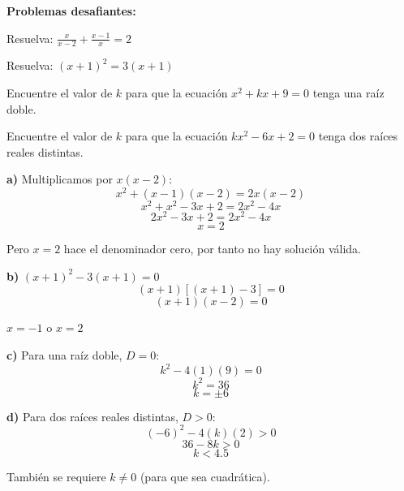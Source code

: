 \begin{exercise}
\problem \textbf{Problemas desafiantes:}

\begin{exerciselist}
    \item Resuelva: $\frac{x}{x-2} + \frac{x-1}{x} = 2$

    \item Resuelva: $(x + 1)^2 = 3(x + 1)$

    \item Encuentre el valor de $k$ para que la ecuación $x^2 + kx + 9 = 0$ tenga una raíz doble.

    \item Encuentre el valor de $k$ para que la ecuación $kx^2 - 6x + 2 = 0$ tenga dos raíces reales distintas.
\end{exerciselist}

\begin{solucion}
\textbf{a)} Multiplicamos por $x(x-2)$:
$$x^2 + (x-1)(x-2) = 2x(x-2)$$
$$x^2 + x^2 - 3x + 2 = 2x^2 - 4x$$
$$2x^2 - 3x + 2 = 2x^2 - 4x$$
$$x = 2$$

Pero $x = 2$ hace el denominador cero, por tanto no hay solución válida.

\textbf{b)} $(x + 1)^2 - 3(x + 1) = 0$
$$(x + 1)[(x + 1) - 3] = 0$$
$$(x + 1)(x - 2) = 0$$

$x = -1$ o $x = 2$

\textbf{c)} Para una raíz doble, $D = 0$:
$$k^2 - 4(1)(9) = 0$$
$$k^2 = 36$$
$$k = \pm 6$$

\textbf{d)} Para dos raíces reales distintas, $D > 0$:
$$(-6)^2 - 4(k)(2) > 0$$
$$36 - 8k > 0$$
$$k < 4.5$$

También se requiere $k \neq 0$ (para que sea cuadrática).
\end{solucion}
\end{exercise}
